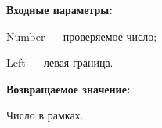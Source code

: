 \textbf{Входные параметры:}  
 
Number --- проверяемое число;
 
Left --- левая граница.

\textbf{Возвращаемое значение:}
 
Число в рамках.